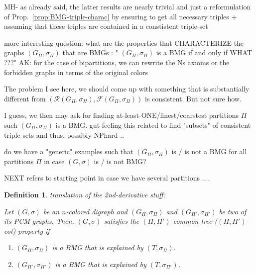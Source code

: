 \documentclass[final,3p,times]{elsarticle}
\newtheorem{definition}{Definition}[section]
\newcommand{\TODO}[1]{\begingroup\color{red}#1\endgroup}
\begin{document}
\TODO{MH- as already said, the latter results are nearly trivial and just a 
	reformulation of  Prop.\   \ref{prop:BMG-triple-charac} by ensuring
	to get all necessary triples +  assuming that these triples are 
	contained in a constistent triple-set

more interesting question: what are the properties that CHARACTERIZE the graphs $(G_\Pi,\sigma_\Pi)$ that are BMGs :
	"	 $(G_\Pi,\sigma_\Pi)$ is a BMG if and	only if   WHAT ???"	AK: for the case of bipartitions, we can rewrite the Ns axioms or the forbidden graphs in terms of the original colors
	
	The problem I see here, we should come up with something that is substantially
	different from $(\mathscr{R}(G_\Pi,\sigma_\Pi) ,\mathscr{F}(G_\Pi,\sigma_\Pi) )$ is consistent.
	But not sure how. 
	
	I guess, we then may ask for finding at-least-ONE/finest/coarstest partitions $\Pi$ such 
	$(G_\Pi,\sigma_\Pi)$ is a BMG. gut-feeling this related to 
	find "subsets" of consistent triple sets and thus, possibly NPhard .. 
 }
 
\TODO{do we have a "generic" examples such that  $(G_\Pi,\sigma_\Pi)$ is / is not a BMG
for all partitions $\Pi$ in case $(G,\sigma)$ is / is not BMG? } 















\TODO{\bigskip \bigskip NEXT refers to starting point in case we have several partitions .... }
\begin{definition}\TODO{translation of the 2nd-derivative stuff:}

Let $(G,\sigma)$ be an $n$-colored digraph 
and $(G_{\Pi},\sigma_{\Pi})$ and $(G_{\Pi'},\sigma_{\Pi'})$ 
be two of its PCM graphs. 
Then, $(G,\sigma)$ satisfies the $(\Pi,\Pi')$-common-tree ($(\Pi,\Pi')$-cot) property
if 
\begin{enumerate}
	\item $(G_{\Pi},\sigma_{\Pi})$ is a BMG that is explained by $(T,\sigma_{\Pi})$.
	\item $(G_{\Pi'},\sigma_{\Pi'})$ is a BMG that is explained by $(T,\sigma_{\Pi'})$.
\end{enumerate}
\end{definition}
\end{document}
